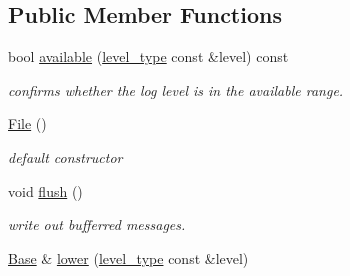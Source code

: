 \subsection*{Public Member Functions}
\begin{DoxyCompactItemize}
\item 
\hypertarget{classhryky_1_1log_1_1writer_1_1_base_a8ce37ac3efe4c77e4020bdbaebda85b3}{bool \hyperlink{classhryky_1_1log_1_1writer_1_1_base_a8ce37ac3efe4c77e4020bdbaebda85b3}{available} (\hyperlink{classhryky_1_1log_1_1level_1_1_entity}{level\-\_\-type} const \&level) const }\label{classhryky_1_1log_1_1writer_1_1_base_a8ce37ac3efe4c77e4020bdbaebda85b3}

\begin{DoxyCompactList}\small\item\em confirms whether the log level is in the available range. \end{DoxyCompactList}\item 
\hyperlink{classhryky_1_1log_1_1writer_1_1_file_a728ce2c2cc1b10c6e2250b384772b563}{File} ()
\begin{DoxyCompactList}\small\item\em default constructor \end{DoxyCompactList}\item 
\hypertarget{classhryky_1_1log_1_1writer_1_1_base_a96f6db3720375594d5e439e37934e1ee}{void \hyperlink{classhryky_1_1log_1_1writer_1_1_base_a96f6db3720375594d5e439e37934e1ee}{flush} ()}\label{classhryky_1_1log_1_1writer_1_1_base_a96f6db3720375594d5e439e37934e1ee}

\begin{DoxyCompactList}\small\item\em write out bufferred messages. \end{DoxyCompactList}\item 
\hypertarget{classhryky_1_1log_1_1writer_1_1_base_a735851176de76433ee681fd20e70a236}{\hyperlink{classhryky_1_1log_1_1writer_1_1_base}{Base} \& \hyperlink{classhryky_1_1log_1_1writer_1_1_base_a735851176de76433ee681fd20e70a236}{lower} (\hyperlink{classhryky_1_1log_1_1level_1_1_entity}{level\-\_\-type} const \&level)}\label{classhryky_1_1log_1_1writer_1_1_base_a735851176de76433ee681fd20e70a236}


\end{DoxyCompactItemize}
